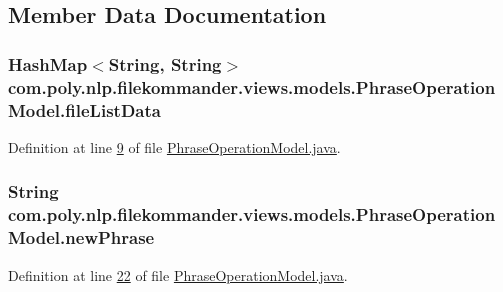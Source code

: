 \subsection{Member Data Documentation}
\hypertarget{classcom_1_1poly_1_1nlp_1_1filekommander_1_1views_1_1models_1_1_phrase_operation_model_afdc0b835818c55deb8ff7f22ec6b3d62}{
\subsubsection[{file\-List\-Data}]{\setlength{\rightskip}{0pt plus 5cm}Hash\-Map$<$String, String$>$ com.\-poly.\-nlp.\-filekommander.\-views.\-models.\-Phrase\-Operation\-Model.\-file\-List\-Data\hspace{0.3cm}{\ttfamily [private]}}}\label{classcom_1_1poly_1_1nlp_1_1filekommander_1_1views_1_1models_1_1_phrase_operation_model_afdc0b835818c55deb8ff7f22ec6b3d62}


Definition at line \hyperlink{L9}{9} of file \hyperlink{}{Phrase\-Operation\-Model.\-java}.

\hypertarget{classcom_1_1poly_1_1nlp_1_1filekommander_1_1views_1_1models_1_1_phrase_operation_model_a5f8b38d37f7d3ee52d15ef572263168c}{
\subsubsection[{new\-Phrase}]{\setlength{\rightskip}{0pt plus 5cm}String com.\-poly.\-nlp.\-filekommander.\-views.\-models.\-Phrase\-Operation\-Model.\-new\-Phrase\hspace{0.3cm}{\ttfamily [private]}}}\label{classcom_1_1poly_1_1nlp_1_1filekommander_1_1views_1_1models_1_1_phrase_operation_model_a5f8b38d37f7d3ee52d15ef572263168c}


Definition at line \hyperlink{L22}{22} of file \hyperlink{}{Phrase\-Operation\-Model.\-java}.

